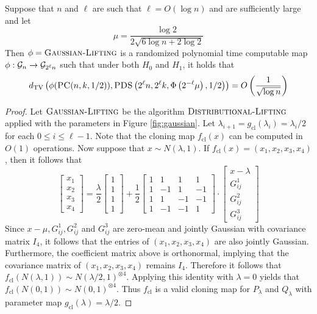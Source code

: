 \begin{lemma} \label{lem:6b}
Suppose that $n$ and $\ell$ are such that $\ell = O(\log n)$ and are sufficiently large and let
$$\mu = \frac{\log 2}{2 \sqrt{6 \log n + 2\log 2}}$$
Then $\phi = \textsc{Gaussian-Lifting}$ is a randomized polynomial time computable map $\phi : \mathcal{G}_n \to \mathcal{G}_{2^\ell n}$ such that under both $H_0$ and $H_1$, it holds that
$$d_{\text{TV}}\left( \phi(\textsc{PC}(n, k, 1/2)), \textsc{PDS}\left(2^\ell n, 2^\ell k, \Phi\left(2^{-\ell}\mu\right), 1/2 \right) \right) = O\left( \frac{1}{\sqrt{\log n}} \right)$$
\end{lemma}

\begin{proof}
Let $\textsc{Gaussian-Lifting}$ be the algorithm $\textsc{Distributional-Lifting}$ applied with the parameters in Figure \ref{fig:gaussian}. Let $\lambda_{i + 1} = g_{\text{cl}}(\lambda_i) = \lambda_i/2$ for each $0 \le i \le \ell - 1$. Note that the cloning map $f_{\text{cl}}(x)$ can be computed in $O(1)$ operations. Now suppose that $x \sim N(\lambda, 1)$. If $f_{\text{cl}}(x) = (x_1, x_2, x_3, x_4)$, then it follows that
$$\left[ \begin{matrix} x_1 \\ x_2 \\ x_3 \\ x_4 \end{matrix} \right] = \frac{\lambda}{2} \left[ \begin{matrix} 1 \\ 1 \\ 1 \\ 1 \end{matrix} \right] + \frac{1}{2} \left[ \begin{array}{rrrr} 1 & 1 & 1 & 1 \\ 1 & -1 & 1 & -1 \\ 1 & 1 & -1 & -1 \\ 1 & -1 & -1 & 1 \end{array} \right] \cdot \left[ \begin{matrix} x - \lambda \\ G^1_{ij} \\ G^2_{ij} \\ G^3_{ij} \end{matrix} \right]$$
Since $x - \mu, G^1_{ij}, G^2_{ij}$ and $G^3_{ij}$ are zero-mean and jointly Gaussian with covariance matrix $I_4$, it follows that the entries of $(x_1, x_2, x_3, x_4)$ are also jointly Gaussian. Furthermore, the coefficient matrix above is orthonormal, implying that the covariance matrix of $(x_1, x_2, x_3, x_4)$ remains $I_4$. Therefore it follows that $f_{\text{cl}}(N(\lambda, 1)) \sim N(\lambda/2, 1)^{\otimes 4}$. Applying this identity with $\lambda = 0$ yields that $f_{\text{cl}}(N(0, 1)) \sim N(0, 1)^{\otimes 4}$. Thus $f_{\text{cl}}$ is a valid cloning map for $P_\lambda$ and $Q_{\lambda}$ with parameter map $ g_{\text{cl}}(\lambda) = \lambda/2$.


\end{proof}
